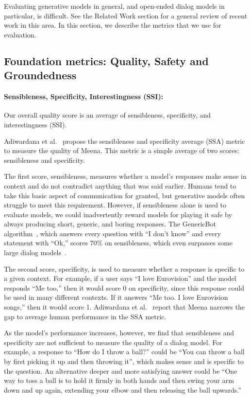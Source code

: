 \documentclass{article}
\def\Factualitymetric{Groundedness\xspace}
\begin{document}
Evaluating generative models in general, and open-ended dialog models in particular, is difficult. See the Related Work section for a general review of recent work in this area. In this section, we describe the metrics that we use for evaluation.

\subsection{Foundation metrics: Quality, Safety and \Factualitymetric}
\label{sec:multitask}

\paragraph{Sensibleness, Specificity, Interestingness (SSI): }Our overall quality score is an average of sensibleness, specificity, and interestingness (SSI).

Adiwardana et al.~\cite{adiwardana2020humanlike} propose the sensibleness and specificity average (SSA) metric to measure the quality of Meena. This metric is a simple average of two scores: sensibleness and specificity.

The first score, sensibleness, measures whether a model’s responses make sense in context and do not contradict anything that was said earlier. Humans tend to take this basic aspect of communication for granted, but generative models often struggle to meet this requirement. However, if sensibleness alone is used to evaluate models, we could inadvertently reward models for playing it safe by always producing short, generic, and boring responses. The GenericBot algorithm~\cite{adiwardana2020humanlike}, which answers every question with ``I don't know'' and every statement with ``Ok,'' scores 70\% on sensibleness, which even surpasses some large dialog models~\cite{adiwardana2020humanlike}.

The second score, specificity, is used to measure whether a response is specific to a given context. For example, if a user says “I love Eurovision” and the model responds “Me too,” then it would score 0 on specificity, since this response could be used in many different contexts. If it answers “Me too. I love Eurovision songs,” then it would score 1. Adiwardana et al.~\cite{adiwardana2020humanlike} report that Meena narrows the gap to average human performance in the SSA metric.

As the model’s performance increases, however, we find that sensibleness and specificity are not sufficient to measure the quality of a dialog model. For example, a response to “How do I throw a ball?” could be “You can throw a ball by first picking it up and then throwing it”, which makes sense and is specific to the question. An alternative deeper and more satisfying answer could be “One way to toss a ball is to hold it firmly in both hands and then swing your arm down and up again, extending your elbow and then releasing the ball upwards.”
\end{document}
